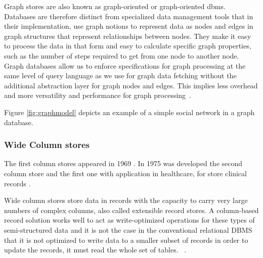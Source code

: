 Graph stores are also known as graph-oriented or graph-oriented \gls{dbms}.
Databases are therefore distinct from specialized data management tools that in their implementation, use graph notions to represent data as nodes and edges in graph structures that represent relationships between nodes. They make it easy to process the data in that form and easy to calculate specific graph properties, such as the number of steps required to get from one node to another node. Graph databases allow us to enforce specifications for graph processing at the same level of query language as we use for graph data fetching without the additional abstraction layer for graph nodes and edges. This implies less overhead and more versatility and performance for graph processing~\cite{6313676,angles2008survey,nosqlchoose}.

Figure \ref{fig:graphmodel} depicts an example of a simple social network in a graph database.



\subsubsection{Wide Column stores}

The first column stores appeared in 1969 \cite{abadi2009column}. In 1975 was developed the second column store and the first one with application in healthcare, for store clinical records \cite{WEYL1975279}.

Wide column stores store data in records with the capacity to carry very large numbers of complex columns, also called extensible record stores. A column-based record solution works well to act as write-optimized operations for these types of semi-structured data and it is not the case in the conventional relational DBMS that it is not optimized to write data to a smaller subset of records in order to update the records, it must read the whole set of tables. ~\cite{wuoverview,nosqlchoose}.

